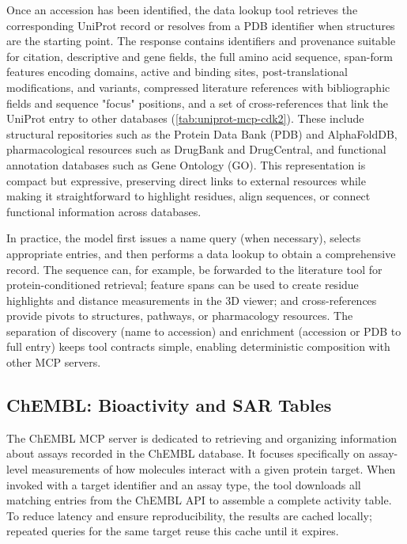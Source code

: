 \documentclass{article}
\begin{document}
Once an accession has been identified, the data lookup tool retrieves the corresponding UniProt record or resolves from a PDB identifier when structures are the starting point. The response contains identifiers and provenance suitable for citation, descriptive and gene fields, the full amino acid sequence, span-form features encoding domains, active and binding sites, post-translational modifications, and variants, compressed literature references with bibliographic fields and sequence "focus" positions, and a set of cross-references that link the UniProt entry to other databases (\cref{tab:uniprot-mcp-cdk2}). These include structural repositories such as the Protein Data Bank (PDB) and AlphaFoldDB, pharmacological resources such as DrugBank and DrugCentral, and functional annotation databases such as Gene Ontology (GO). This representation is compact but expressive, preserving direct links to external resources while making it straightforward to highlight residues, align sequences, or connect functional information across databases.

In practice, the model first issues a name query (when necessary), selects appropriate entries, and then performs a data lookup to obtain a comprehensive record. The sequence can, for example, be forwarded to the literature tool for protein-conditioned retrieval; feature spans can be used to create residue highlights and distance measurements in the 3D viewer; and cross-references provide pivots to structures, pathways, or pharmacology resources. The separation of discovery (name to accession) and enrichment (accession or PDB to full entry) keeps tool contracts simple, enabling deterministic composition with other MCP servers.




\subsection{ChEMBL: Bioactivity and SAR Tables}\label{sec:data:chembl}
The ChEMBL MCP server is dedicated to retrieving and organizing information about assays recorded in the ChEMBL database. It focuses specifically on assay-level measurements of how molecules interact with a given protein target. When invoked with a target identifier and an assay type, the tool downloads all matching entries from the ChEMBL API to assemble a complete activity table. To reduce latency and ensure reproducibility, the results are cached locally; repeated queries for the same target reuse this cache until it expires.
\end{document}
